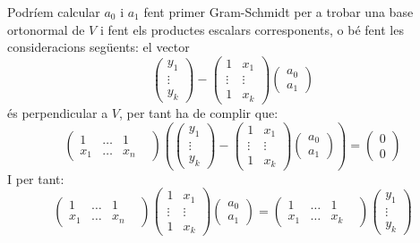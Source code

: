 Podríem calcular $a_0$ i $a_1$ fent primer Gram-Schmidt per a trobar una base ortonormal de $V$ i fent els productes escalars corresponents, o bé fent les consideracions següents: el vector
\[
\begin{pmatrix} y_1 \\ \vdots \\ y_k \end{pmatrix} -
\begin{pmatrix} 1 & x_1 \\ \vdots & \vdots \\ 1 & x_k \end{pmatrix}
\begin{pmatrix} a_0 \\ a_1 \end{pmatrix}
\]
és perpendicular a $V$, per tant ha de complir que:
\[
\begin{pmatrix}
1 & \dots & 1 & \\ x_1 & \dots & x_n
\end{pmatrix}
\left(
\begin{pmatrix} y_1 \\ \vdots \\ y_k \end{pmatrix} -
\begin{pmatrix} 1 & x_1 \\ \vdots & \vdots \\ 1 & x_k \end{pmatrix}
\begin{pmatrix} a_0 \\ a_1 \end{pmatrix}\right) = \begin{pmatrix} 0 \\ 0 \end{pmatrix} 
\]
I per tant:
\[
\begin{pmatrix}
1 & \dots & 1 & \\ x_1 & \dots & x_n
\end{pmatrix}
\begin{pmatrix} 1 & x_1 \\ \vdots & \vdots \\ 1 & x_k \end{pmatrix}
\begin{pmatrix} a_0 \\ a_1 \end{pmatrix} = 
\begin{pmatrix}
1 & \dots & 1 & \\ x_1 & \dots & x_k
\end{pmatrix}
\begin{pmatrix} y_1 \\ \vdots \\ y_k \end{pmatrix}
\]
